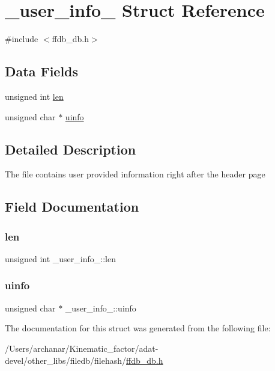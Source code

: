 \hypertarget{struct__user__info__}{}\section{\+\_\+user\+\_\+info\+\_\+ Struct Reference}
\label{struct__user__info__}


{\ttfamily \#include $<$ffdb\+\_\+db.\+h$>$}

\subsection*{Data Fields}
\begin{DoxyCompactItemize}
\item 
unsigned int \mbox{\hyperlink{struct__user__info___a1e0cc62555e343a5fb09fa0fa2bd34ad}{len}}
\item 
unsigned char $\ast$ \mbox{\hyperlink{struct__user__info___a5ab49a33da352185d28bdac39dee8fad}{uinfo}}
\end{DoxyCompactItemize}


\subsection{Detailed Description}
The file contains user provided information right after the header page 

\subsection{Field Documentation}
\mbox{\label{struct__user__info___a1e0cc62555e343a5fb09fa0fa2bd34ad}} 
\subsubsection{\texorpdfstring{len}{len}}
{\footnotesize\ttfamily unsigned int \+\_\+user\+\_\+info\+\_\+\+::len}

\mbox{\label{struct__user__info___a5ab49a33da352185d28bdac39dee8fad}} 
\subsubsection{\texorpdfstring{uinfo}{uinfo}}
{\footnotesize\ttfamily unsigned char $\ast$ \+\_\+user\+\_\+info\+\_\+\+::uinfo}



The documentation for this struct was generated from the following file\+:\begin{DoxyCompactItemize}
\item 
/\+Users/archanar/\+Kinematic\+\_\+factor/adat-\/devel/other\+\_\+libs/filedb/filehash/\mbox{\hyperlink{adat-devel_2other__libs_2filedb_2filehash_2ffdb__db_8h}{ffdb\+\_\+db.\+h}}\end{DoxyCompactItemize}
